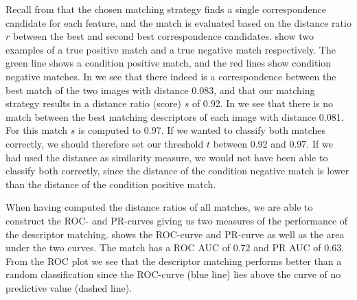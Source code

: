 \documentclass[thesis.tex]{subfiles}
\begin{document}
Recall from  that the chosen matching strategy finds a single correspondence candidate for each feature, and the match is evaluated based on the distance ratio $r$ between the best and second best correspondence candidates.  show two examples of a true positive match and a true negative match respectively. The green line shows a condition positive match, and the red lines show condition negative matches. In  we see that there indeed is a correspondence between the best match of the two images with distance 0.083, and that our matching strategy results in a distance ratio (score) $s$ of 0.92. In  we see that there is no match between the best matching descriptors of each image with distance 0.081. For this match $s$ is computed to 0.97. If we wanted to classify both matches correctly, we should therefore set our threshold $t$ between 0.92 and 0.97. If we had used the distance as similarity measure, we would not have been able to classify both correctly, since the distance of the condition negative match is lower than the distance of the condition positive match.

When having computed the distance ratios of all matches, we are able to construct the ROC- and PR-curves giving us two measures of the performance of the descriptor matching.  shows the ROC-curve  and PR-curve  as well as the area under the two curves. The match has a ROC AUC of 0.72 and PR AUC of 0.63. From the ROC plot we see that the descriptor matching performs better than a random classification since the ROC-curve (blue line) lies above the curve of no predictive value (dashed line).
%
\end{document}
